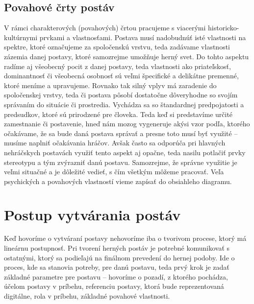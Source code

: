 \documentclass[10pt,twoside,slovak,a4paper]{article}
\begin{document}
\subsection{Povahové črty postáv}\label{3.0:3.2}
V rámci charakterových (povahových) črtou pracujeme s viacerými historicko-kultúrnymi prvkami a vlastnosťami. Postava musí nadobudnúť isté vlastnosti na spektre, ktoré označujeme za spoločenskú vrstvu\cite{CharacterDesign:MPD}, teda zadávame vlastnosti zázemia danej postavy, ktoré samozrejme umožňuje herný svet. Do tohto aspektu radíme aj všeobecný pocit z danej postavy, teda vlastnosti ako priateľskosť, dominantnosť či všeobecná osobnosť sú veľmi špecifické a delikátne premenné, ktoré meníme a upravujeme. Rovnako tak silný vplyv má zaradenie do spoločenskej vrstvy, teda či postava pôsobí dostatočne dôveryhodne so svojím správaním do situácie či prostredia. Vychádza sa so štandardnej predpojatosti a predsudkov, ktoré sú prirodzené pre človeka. Teda keď si predstavíme určité zamestnanie či postavenie, hneď nám mozog vygeneruje akýsi vzor podľa, ktorého očakávame, že sa bude daná postava správať a presne toto musí byť využité – musíme naplniť očakávania hráčov. Avšak často sa odporúča pri hlavných nehráčskych postavách využiť tento aspekt aj opačne, teda nasilu potlačiť prvky stereotypu a tým zvýrazniť danú postavu. Samozrejme, že správne využitie je veľmi situačné a je dôležité vedieť, s čím všetkým môžeme pracovať. Veľa psychických a povahových vlastností vieme zapísať do obsiahleho diagramu.
\section{Postup vytvárania postáv}\label{4.0}
Keď hovoríme o vytváraní postavy nehovoríme iba o tvorivom procese, ktorý má lineárnu postupnosť. Pri tvorení herných postáv je potrebné komunikovať s ostatnými, ktorý sa podieľajú na finálnom prevedení do hernej podoby. Ide o proces, kde sa stanovia potreby, pre danú postavu, teda prvý krok je zadať základné parametre pre postavu – hovoríme o pozadí, z ktorého pochádza, účelom postavy v príbehu, referenciu postavy, ktorá bude reprezentovaná digitálne, rola v príbehu, základné povahové vlastnosti.







\end{document}
